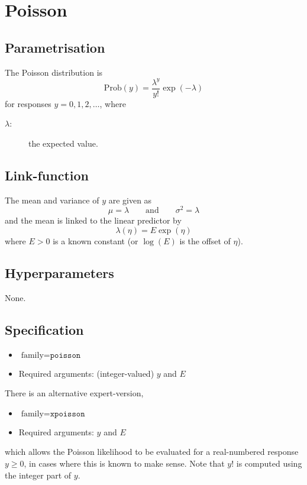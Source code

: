 \documentclass[a4paper,11pt]{article}
\begin{document}
\section*{Poisson}

\subsection*{Parametrisation}

The Poisson distribution is
\begin{displaymath}
    \text{Prob}(y) = \frac{\lambda^{y}}{y!}\exp(-\lambda)
\end{displaymath}
for responses $y=0, 1, 2, \ldots$, where
\begin{description}
\item[$\lambda$:] the expected value.
\end{description}

\subsection*{Link-function}

The mean and variance of $y$ are given as
\begin{displaymath}
    \mu = \lambda \qquad\text{and}\qquad \sigma^{2} = \lambda
\end{displaymath}
and the mean is linked to the linear predictor by
\begin{displaymath}
    \lambda(\eta) = E \exp(\eta)
\end{displaymath}
where $E>0$ is a known constant (or $\log(E)$ is the offset of $\eta$).

\subsection*{Hyperparameters}

None.

\subsection*{Specification}

\begin{itemize}
\item $\text{family}=\texttt{poisson}$
\item Required arguments: (integer-valued) $y$ and $E$
\end{itemize}

\noindent There is an alternative expert-version,
\begin{itemize}
\item $\text{family}=\texttt{xpoisson}$
\item Required arguments: $y$ and $E$
\end{itemize}
which allows the Poisson likelihood to be evaluated for a
real-numbered response $y\ge0$, in cases where this is known to make
sense. Note that $y!$ is computed using the integer part of $y$.
\end{document}
